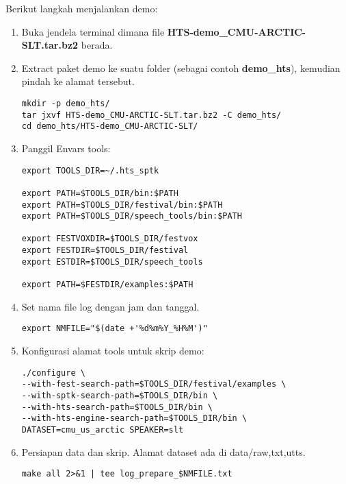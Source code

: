 \documentclass[12pt,]{article}
\begin{document}
	Berikut langkah menjalankan demo:
	
	\begin{enumerate}
		\item Buka jendela terminal dimana file \textbf{HTS-demo\_CMU-ARCTIC-SLT.tar.bz2} berada.
		
		\item Extract paket demo ke suatu folder (sebagai contoh \textbf{demo\_hts}), kemudian pindah ke alamat tersebut.
		\begin{verbatim}
mkdir -p demo_hts/
tar jxvf HTS-demo_CMU-ARCTIC-SLT.tar.bz2 -C demo_hts/
cd demo_hts/HTS-demo_CMU-ARCTIC-SLT/
		\end{verbatim}
		
		\item Panggil Envars tools:
		\begin{verbatim}
export TOOLS_DIR=~/.hts_sptk

export PATH=$TOOLS_DIR/bin:$PATH
export PATH=$TOOLS_DIR/festival/bin:$PATH
export PATH=$TOOLS_DIR/speech_tools/bin:$PATH

export FESTVOXDIR=$TOOLS_DIR/festvox
export FESTDIR=$TOOLS_DIR/festival
export ESTDIR=$TOOLS_DIR/speech_tools

export PATH=$FESTDIR/examples:$PATH
		\end{verbatim}
		
		\item Set nama file log dengan jam dan tanggal.
		\begin{verbatim}
export NMFILE="$(date +'%d%m%Y_%H%M')"
		\end{verbatim}
		
		\item Konfigurasi alamat tools untuk skrip demo:
		\begin{verbatim}
./configure \
--with-fest-search-path=$TOOLS_DIR/festival/examples \
--with-sptk-search-path=$TOOLS_DIR/bin \
--with-hts-search-path=$TOOLS_DIR/bin \
--with-hts-engine-search-path=$TOOLS_DIR/bin \
DATASET=cmu_us_arctic SPEAKER=slt
		\end{verbatim}
		
		\item Persiapan data dan skrip.
		Alamat dataset ada di data/{raw,txt,utts}.
		\begin{verbatim}
make all 2>&1 | tee log_prepare_$NMFILE.txt
		\end{verbatim}
		

\end{enumerate}
\end{document}
